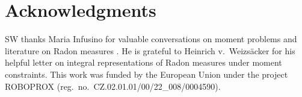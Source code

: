 \documentclass[a4paper,11pt,reqno]{amsart}
\numberwithin{equation}{section}
\theoremstyle{plain}
\theoremstyle{definition}
\begin{document}
\section*{Acknowledgments}
%
SW thanks Maria Infusino for valuable conversations on moment problems and 
literature on Radon measures \cite{schwartz73}. He is grateful to Heinrich 
v.\ Weizs\"{a}cker for his helpful letter on integral representations of 
Radon measures under moment constraints. This work was funded by the 
European Union under the project ROBOPROX (reg.\ no.\ CZ.02.01.01/00/22\_008/0004590).
\par
%
%
\end{document}
